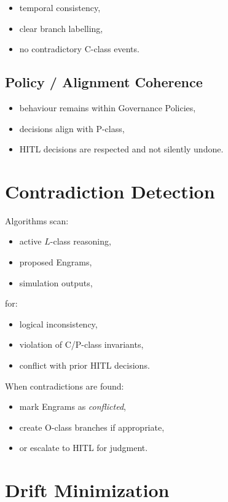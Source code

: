 \begin{itemize}
    \item temporal consistency,
    \item clear branch labelling,
    \item no contradictory C-class events.
\end{itemize}

\subsection{Policy / Alignment Coherence}

\begin{itemize}
    \item behaviour remains within Governance Policies,
    \item decisions align with P-class,
    \item HITL decisions are respected and not silently undone.
\end{itemize}

\section{Contradiction Detection}

Algorithms scan:
\begin{itemize}
    \item active $L$-class reasoning,
    \item proposed Engrams,
    \item simulation outputs,
\end{itemize}
for:
\begin{itemize}
    \item logical inconsistency,
    \item violation of C/P-class invariants,
    \item conflict with prior HITL decisions.
\end{itemize}

When contradictions are found:
\begin{itemize}
    \item mark Engrams as \emph{conflicted},
    \item create O-class branches if appropriate,
    \item or escalate to HITL for judgment.
\end{itemize}

\section{Drift Minimization}

